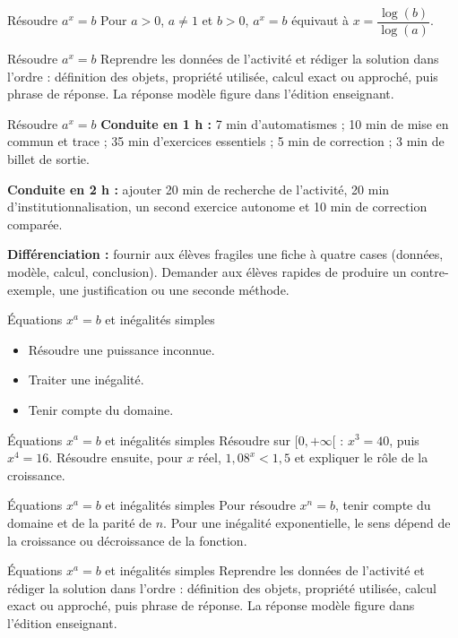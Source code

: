 \documentclass[aspectratio=169,10pt]{beamer}
\begin{document}
\begin{frame}{Résoudre \(a^x=b\)}
Pour \(a>0\), \(a\neq1\) et \(b>0\), \(a^x=b\) équivaut à \(x=\dfrac{\log(b)}{\log(a)}\).
\end{frame}
\begin{frame}{Résoudre \(a^x=b\)}
Reprendre les données de l'activité et rédiger la solution dans l'ordre : définition des objets, propriété utilisée, calcul exact ou approché, puis phrase de réponse. La réponse modèle figure dans l'édition enseignant.
\end{frame}
\begin{frame}{Résoudre \(a^x=b\)}
\textbf{Conduite en 1 h :} 7 min d'automatismes ; 10 min de mise en commun et trace ; 35 min d'exercices essentiels ; 5 min de correction ; 3 min de billet de sortie.

\textbf{Conduite en 2 h :} ajouter 20 min de recherche de l'activité, 20 min d'institutionnalisation, un second exercice autonome et 10 min de correction comparée.

\textbf{Différenciation :} fournir aux élèves fragiles une fiche à quatre cases (données, modèle, calcul, conclusion). Demander aux élèves rapides de produire un contre-exemple, une justification ou une seconde méthode.
\end{frame}
\begin{frame}{Équations \(x^a=b\) et inégalités simples}
\begin{itemize}
\item Résoudre une puissance inconnue.
\item Traiter une inégalité.
\item Tenir compte du domaine.

\end{itemize}
\end{frame}
\begin{frame}{Équations \(x^a=b\) et inégalités simples}
Résoudre sur \([0,+\infty[\) : \(x^3=40\), puis \(x^4=16\). Résoudre ensuite, pour \(x\) réel, \(1{,}08^x<1{,}5\) et expliquer le rôle de la croissance.
\end{frame}
\begin{frame}{Équations \(x^a=b\) et inégalités simples}
Pour résoudre \(x^n=b\), tenir compte du domaine et de la parité de \(n\). Pour une inégalité exponentielle, le sens dépend de la croissance ou décroissance de la fonction.
\end{frame}
\begin{frame}{Équations \(x^a=b\) et inégalités simples}
Reprendre les données de l'activité et rédiger la solution dans l'ordre : définition des objets, propriété utilisée, calcul exact ou approché, puis phrase de réponse. La réponse modèle figure dans l'édition enseignant.
\end{frame}
\end{document}
